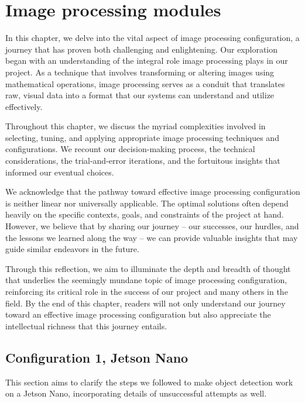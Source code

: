 \section{Image processing modules}
In this chapter, we delve into the vital aspect of image processing configuration, a journey that has proven both challenging and enlightening. Our exploration began with an understanding of the integral role image processing plays in our project. As a technique that involves transforming or altering images using mathematical operations, image processing serves as a conduit that translates raw, visual data into a format that our systems can understand and utilize effectively.

Throughout this chapter, we discuss the myriad complexities involved in selecting, tuning, and applying appropriate image processing techniques and configurations. We recount our decision-making process, the technical considerations, the trial-and-error iterations, and the fortuitous insights that informed our eventual choices.

We acknowledge that the pathway toward effective image processing configuration is neither linear nor universally applicable. The optimal solutions often depend heavily on the specific contexts, goals, and constraints of the project at hand. However, we believe that by sharing our journey – our successes, our hurdles, and the lessons we learned along the way – we can provide valuable insights that may guide similar endeavors in the future.

Through this reflection, we aim to illuminate the depth and breadth of thought that underlies the seemingly mundane topic of image processing configuration, reinforcing its critical role in the success of our project and many others in the field. By the end of this chapter, readers will not only understand our journey toward an effective image processing configuration but also appreciate the intellectual richness that this journey entails.
\newpage

\subsection{Configuration 1, Jetson Nano}
This section aims to clarify the steps we followed to make object detection work on a Jetson Nano, incorporating details of unsuccessful attempts as well.

